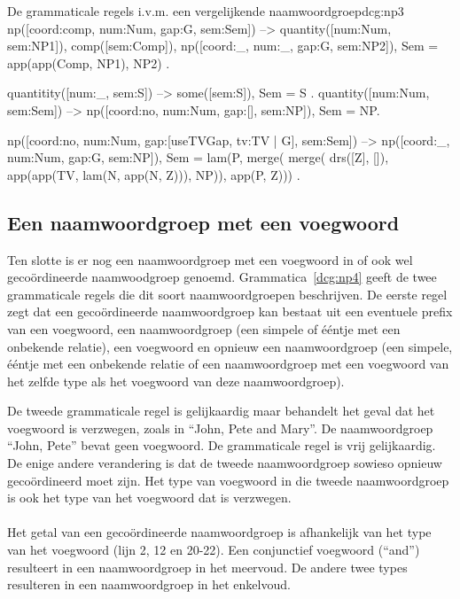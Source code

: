 \begin{dcg}{De grammaticale regels i.v.m. een vergelijkende naamwoordgroep}{dcg:np3}
np([coord:comp, num:Num, gap:G, sem:Sem]) -->
  quantity([num:Num, sem:NP1]),
  comp([sem:Comp]),
  np([coord:_, num:_, gap:G, sem:NP2]),
  { Sem = app(app(Comp, NP1), NP2) }.

quantitity([num:_, sem:S]) -->
  some([sem:S]),
  { Sem = S }.
quantity([num:Num, sem:Sem]) -->
  np([coord:no, num:Num, gap:[], sem:NP]),
  { Sem = NP}.

np([coord:no, num:Num, gap:[useTVGap, tv:TV | G], sem:Sem]) -->
  np([coord:_, num:Num, gap:G, sem:NP]),
  { Sem = lam(P, merge(
      merge(
        drs([Z], []),
        app(app(TV, lam(N, app(N, Z))), NP)),
      app(P, Z))) }.
\end{dcg}

\subsection{Een naamwoordgroep met een voegwoord}
Ten slotte is er nog een naamwoordgroep met een voegwoord in of ook wel gecoördineerde naamwoodgroep genoemd. Grammatica~\ref{dcg:np4} geeft de twee grammaticale regels die dit soort naamwoordgroepen beschrijven. De eerste regel zegt dat een gecoördineerde naamwoordgroep kan bestaat uit een eventuele prefix van een voegwoord, een naamwoordgroep (een simpele of ééntje met een onbekende relatie), een voegwoord en opnieuw een naamwoordgroep (een simpele, ééntje met een onbekende relatie of een naamwoordgroep met een voegwoord van het zelfde type als het voegwoord van deze naamwoordgroep).

De tweede grammaticale regel is gelijkaardig maar behandelt het geval dat het voegwoord is verzwegen, zoals in ``John, Pete and Mary''. De naamwoordgroep ``John, Pete'' bevat geen voegwoord. De grammaticale regel is vrij gelijkaardig. De enige andere verandering is dat de tweede naamwoordgroep sowieso opnieuw gecoördineerd moet zijn. Het type van voegwoord in die tweede naamwoordgroep is ook het type van het voegwoord dat is verzwegen.

\paragraph{} Het getal van een gecoördineerde naamwoordgroep is afhankelijk van het type van het voegwoord (lijn 2, 12 en 20-22). Een conjunctief voegwoord (``and'') resulteert in een naamwoordgroep in het meervoud. De andere twee types resulteren in een naamwoordgroep in het enkelvoud.

